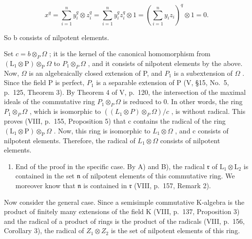 \[
x ^ {q} = \sum_ {i = 1} ^ {n} y _ {i} ^ {q} \otimes z _ {i} ^ {q} = \sum_ {i = 1} ^ {n} y _ {i} ^ {q} z _ {i} ^ {q} \otimes 1 = \left(\sum_ {i = 1} ^ {n} y _ {i} z _ {i}\right) ^ {q} \otimes 1 = 0.
\]

So b consists of nilpotent elements.

Set \(c = b \otimes_{P} \Omega\) ; it is the kernel of the canonical homomorphism from \((\mathrm{L}_{1} \otimes \mathrm{P}) \otimes_{\mathrm{P}} \Omega\) to \(P_{1} \otimes_{P} \Omega\) , and it consists of nilpotent elements by the above. Now, \(\Omega\) is an algebraically closed extension of P, and \(P_{1}\) is a subextension of \(\Omega\) . Since the field P is perfect, \(P_{1}\) is a separable extension of P (V, §15, No.~5, p.~125, Theorem 3). By Theorem 4 of V, p.~120, the intersection of the maximal ideals of the commutative ring \(P_{1} \otimes_{P} \Omega\) is reduced to 0. In other words, the ring \(P_{1} \otimes_{P} \Omega\) , which is isomorphic to \(((L_{1} \otimes P) \otimes_{P} \Omega)/c\) , is without radical. This proves (VIII, p.~155, Proposition 5) that c contains the radical of the ring \((\mathrm{L}_{1} \otimes \mathrm{P}) \otimes_{\mathrm{P}} \Omega\) . Now, this ring is isomorphic to \(L_{1} \otimes \Omega\) , and c consists of nilpotent elements. Therefore, the radical of \(L_{1} \otimes \Omega\) consists of nilpotent elements.

\begin{enumerate}
\def\labelenumi{\Alph{enumi})}
\setcounter{enumi}{2}
\tightlist
\item
  End of the proof in the specific case. By A) and B), the radical \(\mathfrak{r}\) of \(\mathrm{L}_1\otimes \mathrm{L}_2\) is contained in the set \(\mathfrak{n}\) of nilpotent elements of this commutative ring. We moreover know that \(\mathfrak{n}\) is contained in \(\mathfrak{r}\) (VIII, p.~157, Remark 2).
\end{enumerate}

Now consider the general case. Since a semisimple commutative K-algebra is the product of finitely many extensions of the field K (VIII, p.~137, Proposition 3) and the radical of a product of rings is the product of the radicals (VIII, p.~156, Corollary 3), the radical of \(Z_{1} \otimes Z_{2}\) is the set of nilpotent elements of this ring.

